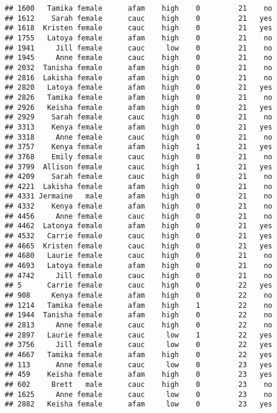 \documentclass[
]{article}
\begin{document}
\begin{verbatim}
## 1600   Tamika female      afam    high    0         21    no
## 1612    Sarah female      cauc    high    0         21   yes
## 1618  Kristen female      cauc    high    0         21   yes
## 1755   Latoya female      afam    high    0         21    no
## 1941     Jill female      cauc     low    0         21    no
## 1945     Anne female      cauc    high    0         21    no
## 2032  Tanisha female      afam    high    0         21    no
## 2816  Lakisha female      afam    high    0         21    no
## 2820   Latoya female      afam    high    0         21   yes
## 2826   Tamika female      afam    high    0         21    no
## 2926   Keisha female      afam    high    0         21   yes
## 2929    Sarah female      cauc    high    0         21    no
## 3313    Kenya female      afam    high    0         21   yes
## 3318     Anne female      cauc    high    0         21    no
## 3757    Kenya female      afam    high    1         21   yes
## 3768    Emily female      cauc    high    0         21    no
## 3799  Allison female      cauc    high    1         21   yes
## 4209    Sarah female      cauc    high    0         21    no
## 4221  Lakisha female      afam    high    0         21    no
## 4331 Jermaine   male      afam    high    0         21    no
## 4332    Kenya female      afam    high    0         21    no
## 4456     Anne female      cauc    high    0         21    no
## 4462  Latonya female      afam    high    0         21   yes
## 4532   Carrie female      cauc    high    0         21   yes
## 4665  Kristen female      cauc    high    0         21   yes
## 4680   Laurie female      cauc    high    0         21    no
## 4693   Latoya female      afam    high    0         21    no
## 4742     Jill female      cauc    high    0         21    no
## 5      Carrie female      cauc    high    0         22   yes
## 908     Kenya female      afam    high    0         22    no
## 1214   Tamika female      afam    high    1         22    no
## 1944  Tanisha female      afam    high    0         22    no
## 2813     Anne female      cauc    high    0         22    no
## 2897   Laurie female      cauc     low    1         22   yes
## 3756     Jill female      cauc     low    0         22   yes
## 4667   Tamika female      afam    high    0         22   yes
## 113      Anne female      cauc     low    0         23   yes
## 459    Keisha female      afam    high    0         23   yes
## 602     Brett   male      cauc    high    0         23    no
## 1625     Anne female      cauc     low    0         23    no
## 2882   Keisha female      afam     low    0         23   yes

\end{verbatim}
\end{document}
